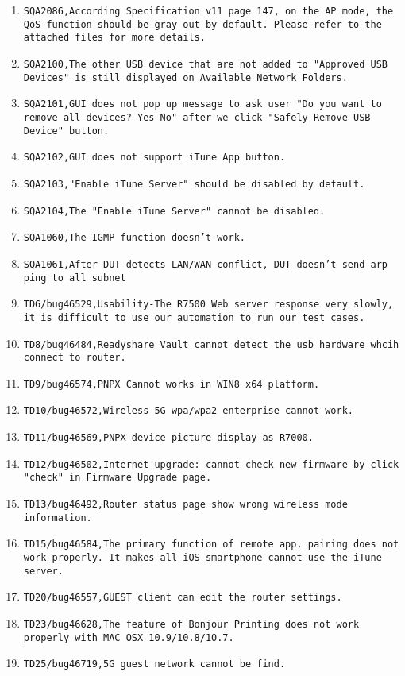 \documentclass[12pt]{report}
\begin{document}
\begin{itemize}
\begin{enumerate}
		\item \texttt{SQA2086,According Specification v11 page 147, on the AP mode, the QoS function should be gray out by default. Please refer to the attached files for more details.}
		\item \texttt{SQA2100,The other USB device that are not added to "Approved USB Devices" is still displayed on Available Network Folders.}
		\item \texttt{SQA2101,GUI does not pop up message to ask user "Do you want to remove all devices? Yes No" after we click "Safely Remove USB Device" button.}
		\item \texttt{SQA2102,GUI does not support iTune App button.}
		\item \texttt{SQA2103,"Enable iTune Server" should be disabled by default.}
		\item \texttt{SQA2104,The "Enable iTune Server" cannot be disabled.}
		\item \texttt{SQA1060,The IGMP function doesn't work.}
		\item \texttt{SQA1061,After DUT detects LAN/WAN conflict, DUT doesn't send arp ping to all subnet}
		\item \texttt{TD6/bug46529,Usability-The R7500 Web server response very slowly, it is difficult to use our automation to run our test cases.}
		\item \texttt{TD8/bug46484,Readyshare Vault cannot detect the usb hardware whcih connect to router.}
		\item \texttt{TD9/bug46574,PNPX Cannot works in WIN8 x64 platform.}
		\item \texttt{TD10/bug46572,Wireless 5G wpa/wpa2 enterprise cannot work.}
		\item \texttt{TD11/bug46569,PNPX device picture display as R7000.}
		\item \texttt{TD12/bug46502,Internet upgrade:  cannot check new firmware by click "check" in Firmware Upgrade page.}
		\item \texttt{TD13/bug46492,Router status page show wrong  wireless mode information.}
		\item \texttt{TD15/bug46584,The primary function of remote app. pairing does not work properly. It makes all iOS smartphone cannot use the iTune server.}
		\item \texttt{TD20/bug46557,GUEST client can edit the router settings.}
		\item \texttt{TD23/bug46628,The feature of Bonjour Printing does not work properly with MAC OSX 10.9/10.8/10.7.}
		\item \texttt{TD25/bug46719,5G guest network cannot be find.}

\end{enumerate}
\end{itemize}
\end{document}
